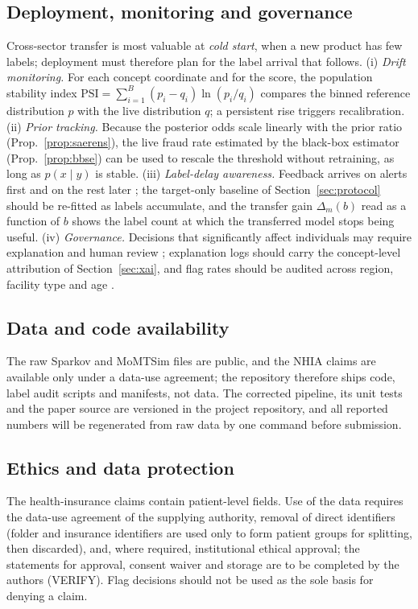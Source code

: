 \documentclass[journal]{IEEEtran}
\newcommand{\1}{\mathbf{1}}
\begin{document}
\subsection{Deployment, monitoring and governance}
Cross-sector transfer is most valuable at \emph{cold start}, when a new product has few labels; deployment must therefore plan for the label arrival that follows. (i) \emph{Drift monitoring.} For each concept coordinate and for the score, the population stability index $\mathrm{PSI}=\sum_{i=1}^{B}(p_i-q_i)\ln(p_i/q_i)$ compares the binned reference distribution $p$ with the live distribution $q$; a persistent rise triggers recalibration. (ii) \emph{Prior tracking.} Because the posterior odds scale linearly with the prior ratio (Prop.~\ref{prop:saerens}), the live fraud rate estimated by the black-box estimator (Prop.~\ref{prop:bbse}) can be used to rescale the threshold without retraining, as long as $p(x\mid y)$ is stable. (iii) \emph{Label-delay awareness.} Feedback arrives on alerts first and on the rest later \cite{dalpozzolo2018realistic}; the target-only baseline of Section~\ref{sec:protocol} should be re-fitted as labels accumulate, and the transfer gain $\Delta_m(b)$ read as a function of $b$ shows the label count at which the transferred model stops being useful. (iv) \emph{Governance.} Decisions that significantly affect individuals may require explanation and human review \cite{goodman2017gdpr}; explanation logs should carry the concept-level attribution of Section~\ref{sec:xai}, and flag rates should be audited across region, facility type and age \cite{mehrabi2021bias}.

\subsection{Data and code availability}
The raw Sparkov and MoMTSim files are public, and the NHIA claims are available only under a data-use agreement; the repository therefore ships code, label audit scripts and manifests, not data. The corrected pipeline, its unit tests and the paper source are versioned in the project repository, and all reported numbers will be regenerated from raw data by one command before submission.

\subsection{Ethics and data protection}
The health-insurance claims contain patient-level fields. Use of the data requires the data-use agreement of the supplying authority, removal of direct identifiers (folder and insurance identifiers are used only to form patient groups for splitting, then discarded), and, where required, institutional ethical approval; the statements for approval, consent waiver and storage are to be completed by the authors (VERIFY). Flag decisions should not be used as the sole basis for denying a claim.
\end{document}
